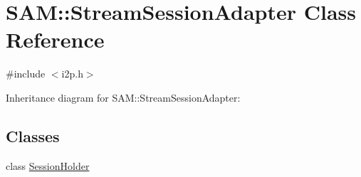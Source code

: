 \hypertarget{class_s_a_m_1_1_stream_session_adapter}{}\section{S\+A\+M\+:\+:Stream\+Session\+Adapter Class Reference}
\label{class_s_a_m_1_1_stream_session_adapter}


{\ttfamily \#include $<$i2p.\+h$>$}



Inheritance diagram for S\+A\+M\+:\+:Stream\+Session\+Adapter\+:
\subsection*{Classes}
\begin{DoxyCompactItemize}
\item 
class \hyperlink{class_s_a_m_1_1_stream_session_adapter_1_1_session_holder}{Session\+Holder}
\end{DoxyCompactItemize}
